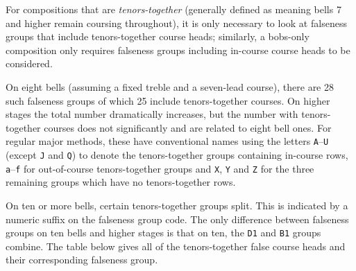 \documentclass[a4paper,11pt,oneside]{book}
\def\textitidx#1{\textit{#1}\index{#1}}
\begin{document}
For compositions that are \textitidx{tenors-together} (generally defined as
meaning bells 7 and higher remain coursing throughout), it is only necessary
to look at falseness groups that include tenors-together course heads;
similarly, a bobs-only composition only requires falseness groups including
in-course 
course heads to be considered.

On eight bells (assuming a fixed treble and a seven-lead course), 
there are 28 such falseness groups of which 25 include tenors-together courses.
On higher stages the total number dramatically increases, but the number
with tenors-together courses does not significantly and are related to eight
bell ones.
For regular major methods, these have 
conventional names using the letters \verb+A+--\verb+U+ (except \verb+J+
and \verb+Q+) to denote the tenors-together groups containing in-course rows,
\verb+a+--\verb+f+ for out-of-course 
tenors-together groups and \verb+X+, \verb+Y+ and \verb+Z+ for the three 
remaining groups which have no tenors-together rows.  

On ten or more bells, certain tenors-together groups split.  This is 
indicated by a numeric suffix on the falseness group code.  The only 
difference between falseness groups on ten bells and higher stages is that 
on ten, the \verb+D1+ and \verb+B1+ groups combine.  The table below gives
all of the tenors-together false course heads and their corresponding 
falseness group.
\end{document}
